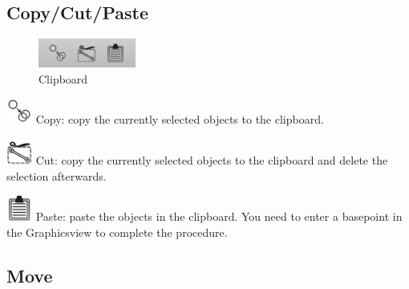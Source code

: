 \documentclass[a4paper,11pt]{report}
\begin{document}
\subsection{Copy/Cut/Paste}
\begin{minipage}[h]{4cm}
\begin{figure}[H]
\begin{center}
\includegraphics[scale=0.6]{./pictures/clipboardtoolbar.png}
\caption{Clipboard}
\label{pic:clipboardtoolbar}
\end{center}
\end{figure}
\end{minipage}
\begin{minipage}[h]{\textwidth-4cm}
\begin{trivlist}
	\item[] \includegraphics[scale = 0.5]{../../icons/copy.png} Copy: copy the currently selected objects to the clipboard.
	\item[] \includegraphics[scale = 0.5]{../../icons/cut.png} Cut: copy the currently selected objects to the clipboard and delete the selection afterwards.
	\item[] \includegraphics[scale = 0.5]{../../icons/paste.png} Paste: paste the objects in the clipboard. You need to enter a basepoint in the Graphicsview to complete the procedure. 
\end{trivlist}
\end{minipage}

\subsection{Move}
\end{document}
